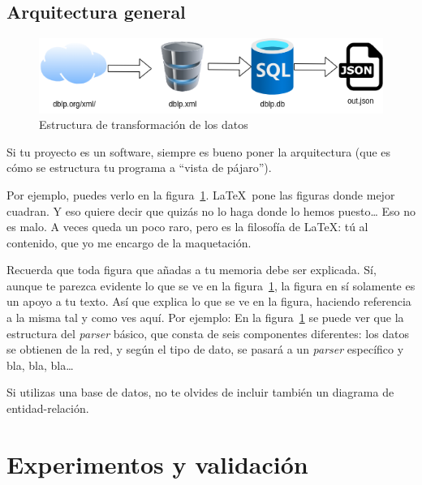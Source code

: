 \documentclass[a4paper, 12pt]{book}
\begin{document}
\section{Arquitectura general} 
\label{sec:arquitectura}

\begin{figure}
  \centering
  \includegraphics[width=16cm, keepaspectratio]{img/esquemadatos.png}
  \caption{Estructura de transformación de los datos}
  \label{fig:arquitectura}
\end{figure}

Si tu proyecto es un software, siempre es bueno poner la arquitectura (que es cómo se estructura tu programa a ``vista de pájaro'').




Por ejemplo, puedes verlo en la figura~\ref{fig:arquitectura}.
\LaTeX \ pone las figuras donde mejor cuadran. 
Y eso quiere decir que quizás no lo haga donde lo hemos puesto\ldots 
Eso no es malo.
A veces queda un poco raro, pero es la filosofía de \LaTeX: tú al contenido, que yo me encargo de la maquetación.


 
Recuerda que toda figura que añadas a tu memoria debe ser explicada.
Sí, aunque te parezca evidente lo que se ve en la figura~\ref{fig:arquitectura}, la figura en sí solamente es un apoyo a tu texto.
Así que explica lo que se ve en la figura, haciendo referencia a la misma tal y como ves aquí.
Por ejemplo: En la figura~\ref{fig:arquitectura} se puede ver que la estructura del \emph{parser} básico, que consta de seis componentes diferentes: los datos se obtienen de la red, y según el tipo de dato, se pasará a un \emph{parser} específico y bla, bla, bla\ldots

Si utilizas una base de datos, no te olvides de incluir también un diagrama de entidad-relación.



\cleardoublepage
\chapter{Experimentos y validación}
\label{chap:experimentos}
\end{document}
